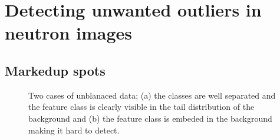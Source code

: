 \documentclass[letterpaper,10pt,english]{sphinxmanual}
\begin{document}
\section{Detecting unwanted outliers in neutron images}
\label{\detokenize{ML4NeutronImageSegmentation:detecting-unwanted-outliers-in-neutron-images}}
\begin{sphinxVerbatim}[commandchars=\\\{\}]
 
 \PYG{p}{[}\PYG{p}{]}
  
\PYG{p}{[}\PYG{p}{]}\PYG{p}{[}\PYG{p}{]}
\end{sphinxVerbatim}

\noindent{}


\subsection{Marked\sphinxhyphen{}up spots}
\label{\detokenize{ML4NeutronImageSegmentation:marked-up-spots}}
\begin{figure}[htbp]
\centering
\capstart

\noindent{}
\caption{Two cases of unblanaced data; (a) the classes are well separated and the feature class is clearly visible in the tail distribution of the background and (b) the feature class is embeded in the background making it hard to detect.}\label{\detokenize{ML4NeutronImageSegmentation:id14}}\end{figure}
\end{document}
